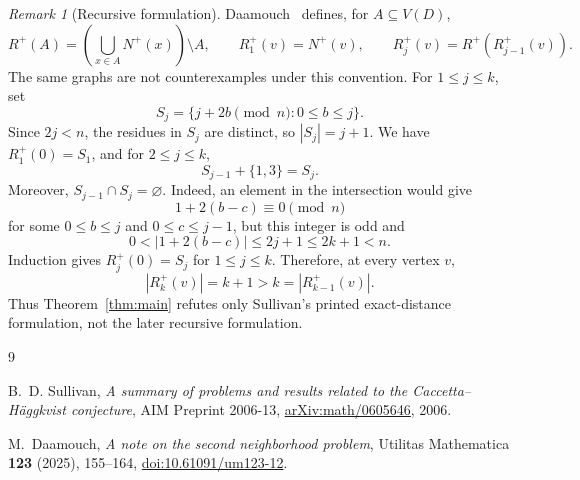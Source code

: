 \documentclass[11pt]{amsart}
\theoremstyle{remark}
\newtheorem{remark}[theorem]{Remark}
\begin{document}
\begin{remark}[Recursive formulation]\label{rem:recursive}
Daamouch~\cite{Daamouch} defines, for $A\subseteq V(D)$,
\[
  R^+(A)=\left(\bigcup_{x\in A}N^+(x)\right)\setminus A,
  \qquad
  R_1^+(v)=N^+(v),
  \qquad
  R_j^+(v)=R^+(R_{j-1}^+(v)).
\]
The same graphs are not counterexamples under this convention. For
$1\le j\le k$, set
\[
  S_j=\{j+2b\pmod n:0\le b\le j\}.
\]
Since $2j<n$, the residues in $S_j$ are distinct, so $|S_j|=j+1$. We have
$R_1^+(0)=S_1$, and for $2\le j\le k$,
\[
  S_{j-1}+\{1,3\}=S_j.
\]
Moreover, $S_{j-1}\cap S_j=\varnothing$. Indeed, an element in the
intersection would give
\[
  1+2(b-c)\equiv0\pmod n
\]
for some $0\le b\le j$ and $0\le c\le j-1$, but this integer is odd and
\[
  0<|1+2(b-c)|\le2j+1\le2k+1<n.
\]
Induction gives $R_j^+(0)=S_j$ for $1\le j\le k$. Therefore, at every
vertex $v$,
\[
  |R_k^+(v)|=k+1>k=|R_{k-1}^+(v)|.
\]
Thus Theorem~\ref{thm:main} refutes only Sullivan's printed exact-distance
formulation, not the later recursive formulation.
\end{remark}

\begin{thebibliography}{9}

B.~D. Sullivan,
\emph{A summary of problems and results related to the
Caccetta--H\"aggkvist conjecture},
AIM Preprint 2006-13,
\href{https://arxiv.org/abs/math/0605646}{arXiv:math/0605646}, 2006.

M.~Daamouch,
\emph{A note on the second neighborhood problem},
Utilitas Mathematica \textbf{123} (2025), 155--164,
\href{https://doi.org/10.61091/um123-12}{doi:10.61091/um123-12}.

\end{thebibliography}
\end{document}
